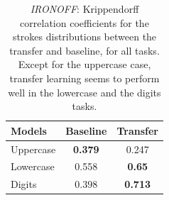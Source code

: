       \begin{table}[!htbp]
        \centering
        \begin{tabular}{l c c} \hline
        Models & Baseline & Transfer \\ \hline
        Uppercase & \textbf{0.379} & 0.247 \\ %
        Lowercase & 0.558 & \textbf{0.65} \\ %
        Digits & 0.398  & \textbf{0.713} \\ \hline
        \end{tabular}
        \caption{\textit{IRONOFF}: Krippendorff correlation coefficients for the strokes distributions between the transfer and baseline, for all tasks. Except for the uppercase case, transfer learning seems to perform well in the lowercase and the digits tasks.}
        \label{table:ironoff_strokes_transfer}
      \end{table}

